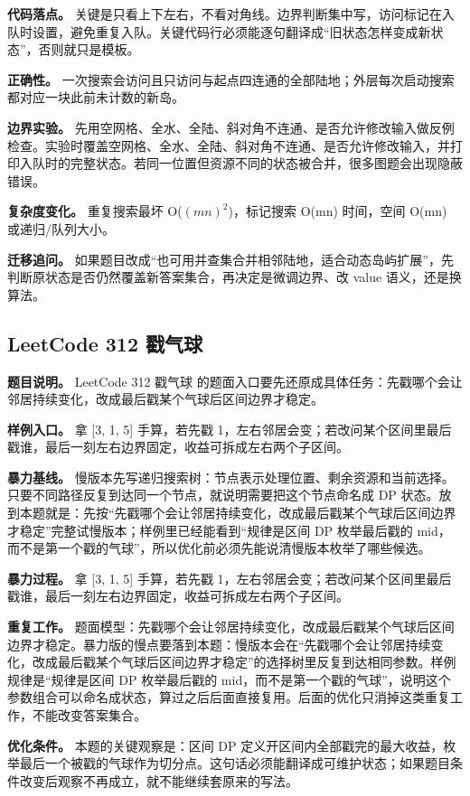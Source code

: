 \textbf{代码落点。} 关键是只看上下左右，不看对角线。边界判断集中写，访问标记在入队时设置，避免重复入队。关键代码行必须能逐句翻译成“旧状态怎样变成新状态”，否则就只是模板。

\textbf{正确性。} 一次搜索会访问且只访问与起点四连通的全部陆地；外层每次启动搜索都对应一块此前未计数的新岛。

\textbf{边界实验。} 先用空网格、全水、全陆、斜对角不连通、是否允许修改输入做反例检查。实验时覆盖空网格、全水、全陆、斜对角不连通、是否允许修改输入，并打印入队时的完整状态。若同一位置但资源不同的状态被合并，很多图题会出现隐蔽错误。

\textbf{复杂度变化。} 重复搜索最坏 O(\ensuremath{(mn)^{2}})，标记搜索 O(mn) 时间，空间 O(mn) 或递归/队列大小。

\textbf{迁移追问。} 如果题目改成“也可用并查集合并相邻陆地，适合动态岛屿扩展”，先判断原状态是否仍然覆盖新答案集合，再决定是微调边界、改 value 语义，还是换算法。

\subsection{LeetCode 312 戳气球}

\textbf{题目说明。} LeetCode 312 戳气球 的题面入口要先还原成具体任务：先戳哪个会让邻居持续变化，改成最后戳某个气球后区间边界才稳定。

\textbf{样例入口。} 拿 [3, 1, 5] 手算，若先戳 1，左右邻居会变；若改问某个区间里最后戳谁，最后一刻左右边界固定，收益可拆成左右两个子区间。

\textbf{暴力基线。} 慢版本先写递归搜索树：节点表示处理位置、剩余资源和当前选择。只要不同路径反复到达同一个节点，就说明需要把这个节点命名成 DP 状态。放到本题就是：先按“先戳哪个会让邻居持续变化，改成最后戳某个气球后区间边界才稳定”完整试慢版本；样例里已经能看到“规律是区间 DP 枚举最后戳的 mid，而不是第一个戳的气球”，所以优化前必须先能说清慢版本枚举了哪些候选。

\textbf{暴力过程。} 拿 [3, 1, 5] 手算，若先戳 1，左右邻居会变；若改问某个区间里最后戳谁，最后一刻左右边界固定，收益可拆成左右两个子区间。

\textbf{重复工作。} 题面模型：先戳哪个会让邻居持续变化，改成最后戳某个气球后区间边界才稳定。暴力版的慢点要落到本题：慢版本会在“先戳哪个会让邻居持续变化，改成最后戳某个气球后区间边界才稳定”的选择树里反复到达相同参数。样例规律是“规律是区间 DP 枚举最后戳的 mid，而不是第一个戳的气球”，说明这个参数组合可以命名成状态，算过之后后面直接复用。后面的优化只消掉这类重复工作，不能改变答案集合。

\textbf{优化条件。} 本题的关键观察是：区间 DP 定义开区间内全部戳完的最大收益，枚举最后一个被戳的气球作为切分点。这句话必须能翻译成可维护状态；如果题目条件改变后观察不再成立，就不能继续套原来的写法。

